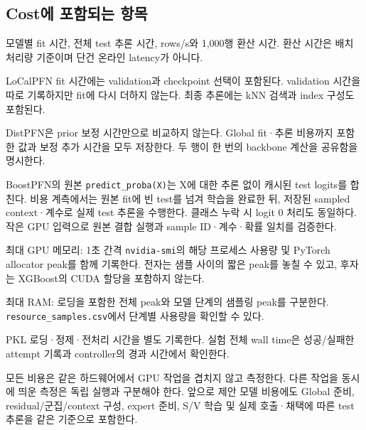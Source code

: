 \subsection{Cost에 포함되는 항목}
\par\noindent \textbullet\enspace 모델별 fit 시간, 전체 test 추론 시간, rows/\allowbreak{}s와 1,000행 환산 시간. 환산 시간은 배치 처리량 기준이며 단건 온라인 latency가 아니다.


\par\noindent \textbullet\enspace LoCalPFN fit 시간에는 validation과 checkpoint 선택이 포함된다. validation 시간을 따로 기록하지만 fit에 다시 더하지 않는다. 최종 추론에는 kNN 검색과 index 구성도 포함된다.


\par\noindent \textbullet\enspace DistPFN은 prior 보정 시간만으로 비교하지 않는다. Global fit·추론 비용까지 포함한 값과 보정 추가 시간을 모두 저장한다. 두 행이 한 번의 backbone 계산을 공유함을 명시한다.


\par\noindent \textbullet\enspace BoostPFN의 원본 \texttt{predict\_\allowbreak{}\allowbreak{}proba(X)\allowbreak{}}는 X에 대한 추론 없이 캐시된 test logits를 합친다. 비용 계측에서는 원본 fit에 빈 test를 넘겨 학습을 완료한 뒤, 저장된 sampled context·계수로 실제 test 추론을 수행한다. 클래스 누락 시 logit 0 처리도 동일하다. 작은 GPU 입력으로 원본 결합 실행과 sample ID·계수·확률 일치를 검증한다.


\par\noindent \textbullet\enspace 최대 GPU 메모리: 1초 간격 \texttt{nvidia-\allowbreak{}s\allowbreak{}mi}의 해당 프로세스 사용량 및 PyTorch allocator peak를 함께 기록한다. 전자는 샘플 사이의 짧은 peak를 놓칠 수 있고, 후자는 XGBoost의 CUDA 할당을 포함하지 않는다.


\par\noindent \textbullet\enspace 최대 RAM: 로딩을 포함한 전체 peak와 모델 단계의 샘플링 peak를 구분한다. \texttt{resource\allowbreak{}\_\allowbreak{}\allowbreak{}samples\allowbreak{}.\allowbreak{}csv}에서 단계별 사용량을 확인할 수 있다.


\par\noindent \textbullet\enspace PKL 로딩·정제·전처리 시간을 별도 기록한다. 실험 전체 wall time은 성공/\allowbreak{}실패한 attempt 기록과 controller의 경과 시간에서 확인한다.


모든 비용은 같은 하드웨어에서 GPU 작업을 겹치지 않고 측정한다. 다른 작업을 동시에 띄운 측정은 독립 실행과 구분해야 한다. 앞으로 제안 모델 비용에도 Global 준비, residual/\allowbreak{}군집/\allowbreak{}context 구성, expert 준비, S/\allowbreak{}V 학습 및 실제 호출·채택에 따른 test 추론을 같은 기준으로 포함한다.

